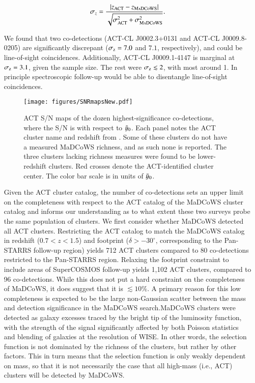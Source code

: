 \documentclass[longauth]{aa} %
\newcommand{\madcows}{MaDCoWS\xspace}
\newcommand{\yc}{$\Tilde{\vary}_0$\xspace}
\begin{document}
\begin{equation}
    \sigma_{z} = \frac{|z_{\textsc{ACT}}-z_{\textsc{\madcows}}|}{\sqrt{ \sigma_{\textsc{ACT}}^2 + \sigma_{\textsc{\madcows}}^2}}
.\end{equation}

We found that two co-detections (ACT-CL J0002.3+0131 and ACT-CL J0009.8-0205) are significantly discrepant ($\sigma_{\textsc{z}} = 7.0$ and $7.1$, respectively), and could be line-of-sight coincidences. Additionally, ACT-CL J0009.1-4147 is marginal at $\sigma_{\textsc{z}} = 3.1$, given the sample size. The rest were $ \sigma_{\textsc{z}} \lesssim 2$, with most around 1. In principle spectroscopic follow-up would be able to disentangle line-of-sight coincidences.

\begin{figure*}
    \centering
    \texttt{[image: figures/SNRmapsNew.pdf]}
    \caption{ACT S/N maps of the dozen highest-significance co-detections, where the S/N is with respect to \yc. Each panel notes the ACT cluster name and redshift from \citet{Hilton2021}. Some of these clusters do not have a measured MaDCoWS richness, and as such none is reported. The three clusters lacking richness measures were found to be lower-redshift clusters. Red crosses denote the ACT-identified cluster center. The color bar scale is in units of \yc.}
    \label{fig:stamps}
\end{figure*}


Given the ACT cluster catalog, the number of co-detections sets an upper limit on the completeness with respect to the ACT catalog of the MaDCoWS cluster catalog and informs our understanding as to what extent these two surveys probe the same population of clusters. We first consider whether MaDCoWS detected all ACT clusters. Restricting the ACT catalog to match the MaDCoWS catalog in redshift ($0.7<z<1.5$) and footprint ($\delta > -30^\circ$, corresponding to the Pan-STARRS follow-up region) yields 712 ACT clusters compared to 80 co-detections restricted to the Pan-STARRS region. Relaxing the footprint constraint to include areas of SuperCOSMOS follow-up yields 1,102 ACT clusters, compared to 96 co-detections. 
While this does not put a hard constraint on the completeness of MaDCoWS, it does suggest that it is $\lesssim 10\%$. A primary reason for this low completeness is expected to be the large non-Gaussian scatter between the mass and detection significance in the MaDCoWS search.MaDCoWS clusters were detected as galaxy excesses traced by the bright tip of the luminosity function, with the strength of the signal significantly affected by both Poisson statistics and blending of galaxies at the resolution of WISE. In other words, the selection function is not dominated by the richness of the clusters, but rather by other factors. This in turn means that the selection function is only weakly dependent on mass, so that it is not necessarily the case that all high-mass (i.e., ACT) clusters will be detected by MaDCoWS.
\end{document}
